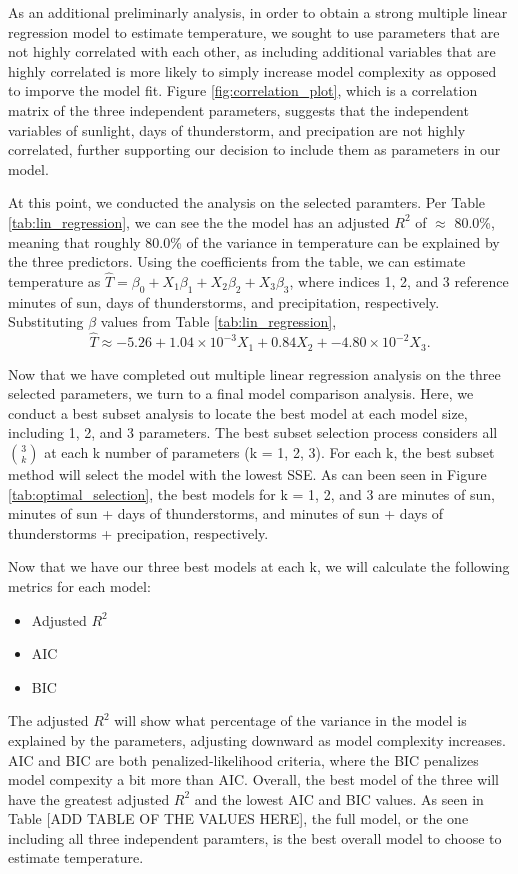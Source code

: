 As an additional preliminarly analysis, in order to obtain a strong multiple linear regression model to estimate temperature, we sought to use parameters that are not highly correlated with each other, as including additional variables that are highly correlated is more likely to simply increase model complexity as opposed to imporve the model fit. Figure \ref{fig:correlation_plot}, which is a correlation matrix of the three independent parameters, suggests that the independent variables of sunlight, days of thunderstorm, and precipation are not highly correlated, further supporting our decision to include them as parameters in our model.

At this point, we conducted the analysis on the selected paramters. Per Table \ref{tab:lin_regression}, we can see the the model has an adjusted $R^{2}$ of $\approx$ 80.0\%, meaning that roughly 80.0\% of the variance in temperature can be explained by the three predictors. Using the coefficients from the table, we can estimate temperature as $\hat{T} = \beta_{0} + X_{1}\beta_{1} + X_{2}\beta_{2} + X_{3}\beta_{3}$, where indices 1, 2, and 3 reference minutes of sun, days of thunderstorms, and precipitation, respectively. Substituting $\beta$ values from Table \ref{tab:lin_regression}, $$\hat{T} \approx -5.26 + 1.04 \times 10^{-3}X_{1} + 0.84X_{2} + -4.80\times 10^{-2}X_{3}.$$

Now that we have completed out multiple linear regression analysis on the three selected parameters, we turn to a final model comparison analysis. Here, we conduct a best subset analysis to locate the best model at each model size, including 1, 2, and 3 parameters. The best subset selection process considers all $3 \choose k$ at each k number of parameters (k = 1, 2, 3). For each k, the best subset method will select the model with the lowest SSE. As can been seen in Figure \ref{tab:optimal_selection}, the best models for k = 1, 2, and 3 are minutes of sun, minutes of sun + days of thunderstorms, and minutes of sun + days of thunderstorms + precipation, respectively.

Now that we have our three best models at each k, we will calculate the following metrics for each model: 

\begin{itemize}
	\item Adjusted $R^{2}$
	\item AIC
	\item BIC
\end{itemize}

The adjusted $R^{2}$ will show what percentage of the variance in the model is explained by the parameters, adjusting downward as model complexity increases. AIC and BIC are both penalized-likelihood criteria, where the BIC penalizes model compexity a bit more than AIC. Overall, the best model of the three will have the greatest adjusted $R^{2}$ and the lowest AIC and BIC values. As seen in Table [ADD TABLE OF THE VALUES HERE], the full model, or the one including all three independent paramters, is the best overall model to choose to estimate temperature.

